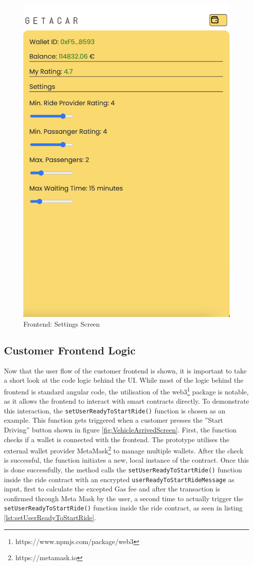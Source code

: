\begin{figure}[H]
    \centering
    \includegraphics[width=0.45\linewidth]{data/ffss/13.png}
    \caption{Frontend: Settings Screen}
    \label{fig:SettingsScreen}
\end{figure}


\subsection{Customer Frontend Logic}
Now that the user flow of the customer frontend is shown, it is important to take a short look at the code logic behind the UI. While most of the logic behind the frontend is standard angular code, the utilisation of the web3\footnote{https://www.npmjs.com/package/web3} package is notable, as it allows the frontend to interact with smart contracts directly. To demonstrate this interaction, the \texttt{setUserReadyToStartRide()} function is chosen as an example. This function gets triggered when a customer presses the ''Start Driving'' button shown in figure \ref{fig:VehicleArrivedScreen}. First, the function checks if a wallet is connected with the frontend. The prototype utilises the external wallet provider MetaMask\footnote{https://metamask.io} to manage multiple wallets. After the check is successful, the function initiates a new, local instance of the contract. Once this is done successfully, the method calls the \texttt{setUserReadyToStartRide()} function inside the ride contract with an encrypted \texttt{userReadyToStartRideMessage} as input, first to calculate the excepted Gas fee and after the transaction is confirmed through Meta Mask by the user, a second time to actually trigger the \texttt{setUserReadyToStartRide()} function inside the ride contract, as seen in listing \ref{lst:setUserReadyToStartRide}.

